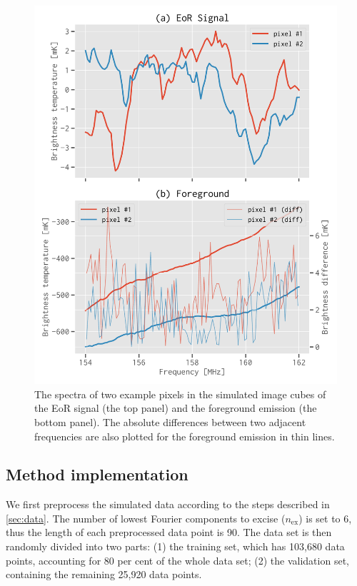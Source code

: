 \documentclass[letters,a4paper,fleqn,usenatbib]{mnras}
\newcommand{\R}[1]{\mathrm{#1}}
\begin{document}
\begin{figure}
  \centering
  \includegraphics[width=\columnwidth]{simudata}
  \caption{\label{fig:simudata}%
    The spectra of two example pixels in the simulated image cubes
    of the EoR signal (the top panel) and the foreground emission
    (the bottom panel).
    The absolute differences between two adjacent frequencies are
    also plotted for the foreground emission in thin lines.
  }
\end{figure}


\subsection{Method implementation}
\label{sec:implementation}

We first preprocess the simulated data according to the steps described
in \autoref{sec:data}.
The number of lowest Fourier components to excise ($n_{\R{ex}}$) is
set to 6, thus the length of each preprocessed data point is 90.
The data set is then randomly divided into two parts:
(1) the training set, which has 103,680 data points, accounting for
80 per cent of the whole data set;
(2) the validation set, containing the remaining 25,920 data points.
\end{document}
